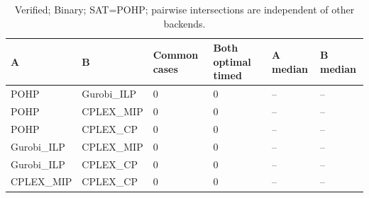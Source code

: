 \begin{table}[htbp]
\centering
\caption{Verified; Binary; SAT=POHP; pairwise intersections are independent of other backends.}
\label{tab:p2b-Binary-pairs}
\begin{tabular}{llllll}
\hline
A & B & Common cases & Both optimal timed & A median & B median \\
\hline
POHP & Gurobi\_ILP & 0 & 0 & -- & -- \\
POHP & CPLEX\_MIP & 0 & 0 & -- & -- \\
POHP & CPLEX\_CP & 0 & 0 & -- & -- \\
Gurobi\_ILP & CPLEX\_MIP & 0 & 0 & -- & -- \\
Gurobi\_ILP & CPLEX\_CP & 0 & 0 & -- & -- \\
CPLEX\_MIP & CPLEX\_CP & 0 & 0 & -- & -- \\
\hline
\end{tabular}
\end{table}
